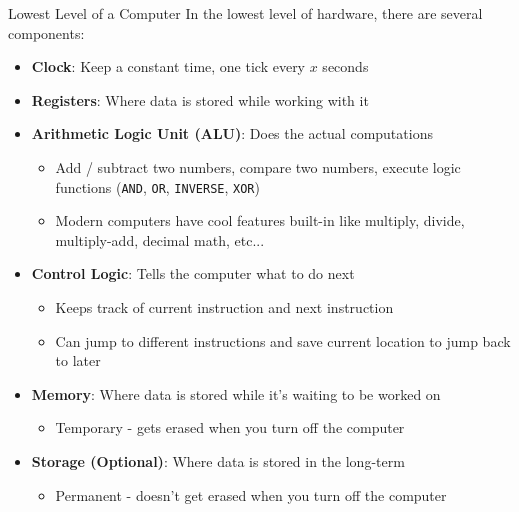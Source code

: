 \documentclass[]{beamer}
\begin{document}
\begin{frame}{Lowest Level of a Computer}
    In the lowest level of hardware, there are several components:

    \begin{itemize}
        \item \textbf{Clock}: Keep a constant time, one tick every $x$ seconds
        \item \textbf{Registers}: Where data is stored while working with it
        \item \textbf{Arithmetic Logic Unit (ALU)}: Does the actual computations
              \begin{itemize}
                  \item Add / subtract two numbers, compare two numbers, execute logic functions (\texttt{AND}, \texttt{OR}, \texttt{INVERSE}, \texttt{XOR})
                  \item Modern computers have cool features built-in like multiply, divide, multiply-add, decimal math, etc...
              \end{itemize}
        \item \textbf{Control Logic}: Tells the computer what to do next
              \begin{itemize}
                  \item Keeps track of current instruction and next instruction
                  \item Can jump to different instructions and save current location to jump back to later
              \end{itemize}
        \item \textbf{Memory}: Where data is stored while it's waiting to be worked on
              \begin{itemize}
                  \item Temporary - gets erased when you turn off the computer
              \end{itemize}
        \item \textbf{Storage (Optional)}: Where data is stored in the long-term
              \begin{itemize}
                  \item Permanent - doesn't get erased when you turn off the computer
              \end{itemize}
    \end{itemize}

\end{frame}
\end{document}
